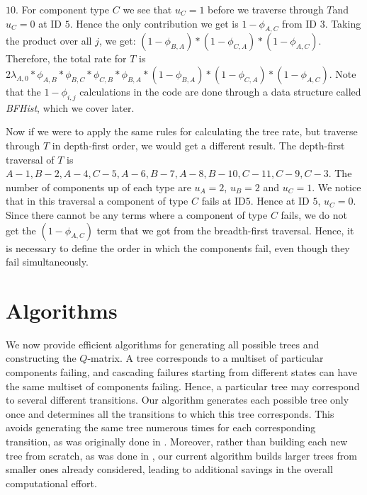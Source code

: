 \documentclass[12pt]{article}
\newcommand{\varName}[1]{\textrm{\it#1}}
\begin{document}
$10$. For component type $C$ we see that $u_C = 1$ before we traverse through $T$and $u_C = 0$ at ID $5$. Hence the only contribution we get is $1 - \phi_{A, C}$ from ID $3$. Taking the product over all $j$, we get: $(1 - \phi_{B, A}) * (1 - \phi_{C, A}) * (1 - \phi_{A,C})$. Therefore, the total rate for $T$ is $2 \lambda_{A, 0} * \phi_{A, B} * \phi_{B, C} * \phi_{C, B} * \phi_{B, A} * (1 - \phi_{B, A}) * (1 - \phi_{C, A}) * (1 - \phi_{A, C})$. Note that the $1 - \phi_{i, j}$ calculations in the code are done through a data structure called \varName{BFHist}, which we cover later. 

Now if we were to apply the same rules for calculating the tree rate, but traverse through $T$ in depth-first order, we would get a different result. The depth-first traversal of $T$ is $A-1, B-2, A-4, C-5, A-6, B-7, A-8, B-10, C-11, C-9, C-3$. The number of components up of each type are $u_A = 2$, $u_B = 2$ and $u_C = 1$. We notice that in this traversal a component of type $C$ fails at ID$5$. Hence at ID $5$, $u_C = 0$. Since there cannot be any terms where a component of type $C$ fails, we do not get the $(1 - \phi_{A,C})$ term that we got from the breadth-first traversal. Hence, it is necessary to define the order in which the components fail, even though they fail simultaneously.     

\section{Algorithms}
\label{sec:alg}

We now provide efficient algorithms for generating all possible trees and constructing the $Q$-matrix. A tree corresponds to a multiset of particular components failing, and cascading failures starting from different states can have the same multiset of components failing. Hence, a particular tree may correspond to several different transitions. Our algorithm generates each possible tree only once and determines all the transitions to which this tree corresponds. This avoids generating the same tree numerous times for each corresponding transition, as was originally done in \cite{ING:2009}. Moreover, rather than building each new tree from scratch, as was done in \cite{ING:2009}, our current algorithm builds larger trees from smaller ones already considered, leading to additional savings in the overall computational effort.
\end{document}
